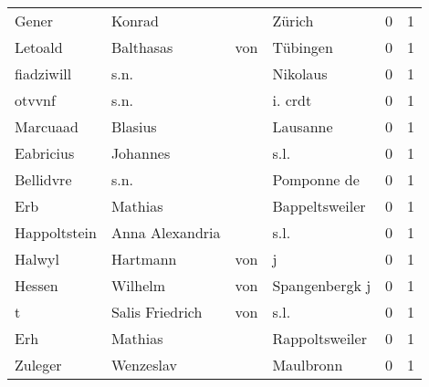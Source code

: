\begin{tabular}{llllrr}
                    Gener &                             Konrad &             &                                      Zürich &          0 &         1 \\
                  Letoald &                          Balthasas &         von &                                    Tübingen &          0 &         1 \\
               fiadziwill &                               s.n. &             &                                    Nikolaus &          0 &         1 \\
                   otvvnf &                               s.n. &             &                                     i. crdt &          0 &         1 \\
                 Marcuaad &                            Blasius &             &                                    Lausanne &          0 &         1 \\
                Eabricius &                           Johannes &             &                                        s.l. &          0 &         1 \\
                Bellidvre &                               s.n. &             &                                 Pomponne de &          0 &         1 \\
                      Erb &                            Mathias &             &                              Bappeltsweiler &          0 &         1 \\
             Happoltstein &                    Anna Alexandria &             &                                        s.l. &          0 &         1 \\
                   Halwyl &                           Hartmann &         von &                                           j &          0 &         1 \\
                   Hessen &                            Wilhelm &         von &                              Spangenbergk j &          0 &         1 \\
                        t &                    Salis Friedrich &         von &                                        s.l. &          0 &         1 \\
                      Erh &                            Mathias &             &                              Rappoltsweiler &          0 &         1 \\
                  Zuleger &                          Wenzeslav &             &                                   Maulbronn &          0 &         1 \\

\end{tabular}
